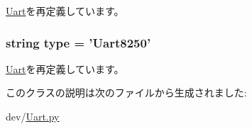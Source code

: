 \hyperlink{classUart_1_1Uart_a17da7064bc5c518791f0c891eff05fda}{Uart}を再定義しています。\hypertarget{classUart_1_1Uart8250_acce15679d830831b0bbe8ebc2a60b2ca}{
\subsubsection[{type}]{\setlength{\rightskip}{0pt plus 5cm}string {\bf type} = '{\bf Uart8250}'}}
\label{classUart_1_1Uart8250_acce15679d830831b0bbe8ebc2a60b2ca}


\hyperlink{classUart_1_1Uart_acce15679d830831b0bbe8ebc2a60b2ca}{Uart}を再定義しています。

このクラスの説明は次のファイルから生成されました:\begin{DoxyCompactItemize}
\item 
dev/\hyperlink{Uart_8py}{Uart.py}\end{DoxyCompactItemize}
